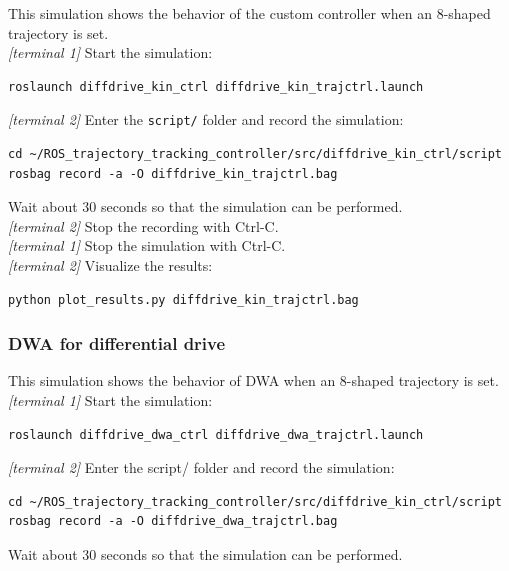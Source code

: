 \documentclass[11pt,a4paper]{article}
\begin{document}
This simulation shows the behavior of the custom controller when an 8-shaped trajectory is set.\\

\textit{[terminal 1]} Start the simulation:
\begin{lstlisting}
roslaunch diffdrive_kin_ctrl diffdrive_kin_trajctrl.launch
\end{lstlisting}


\textit{[terminal 2]} Enter the \texttt{script/} folder and record the simulation:
\begin{lstlisting}
cd ~/ROS_trajectory_tracking_controller/src/diffdrive_kin_ctrl/script
rosbag record -a -O diffdrive_kin_trajctrl.bag
\end{lstlisting}

Wait about 30 seconds so that the simulation can be performed.\\

\textit{[terminal 2]} Stop the recording with Ctrl-C.\\

\textit{[terminal 1]} Stop the simulation with Ctrl-C.\\

\textit{[terminal 2]} Visualize the results:
\begin{lstlisting}
python plot_results.py diffdrive_kin_trajctrl.bag
\end{lstlisting}

\subsubsection{DWA for differential drive}

This simulation shows the behavior of DWA when an 8-shaped trajectory is set.\\

\textit{[terminal 1]} Start the simulation:
\begin{lstlisting}
roslaunch diffdrive_dwa_ctrl diffdrive_dwa_trajctrl.launch
\end{lstlisting}

\textit{[terminal 2]} Enter the script/ folder and record the simulation:
\begin{lstlisting}
cd ~/ROS_trajectory_tracking_controller/src/diffdrive_kin_ctrl/script
rosbag record -a -O diffdrive_dwa_trajctrl.bag
\end{lstlisting}

Wait about 30 seconds so that the simulation can be performed.\\
\end{document}

